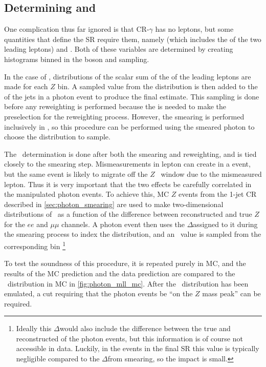 \subsection{Determining \HT and \mll}
\label{sec:photon_mll}

One complication thus far ignored is that CR-$\gamma$ has no leptons, but some quantities that define the \ac{SR} require them, namely \HT (which includes the \pt of the two leading leptons) and \mll. Both of these variables are determined by creating histograms binned in the boson \pt and sampling. 

In the case of \HT, distributions of the scalar sum of the \pt of the leading leptons are made for each $Z$ \pt bin. A sampled value from the distribution is then added to the \HT of the jets in a photon event to produce the final estimate. This sampling is done before any reweighting is performed because the \HT is needed to make the preselection for the reweighting process. However, the smearing is performed inclusively in \HT, so this procedure can be performed using the smeared photon \pt to choose the distribution to sample. 

The \mll~determination is done after both the smearing and reweighting, and is tied closely to the smearing step. Mismeasurements in lepton \pt can create \met in a \dyjets event, but the same event is likely to migrate off the $Z$ \mll~window due to the mismeasured lepton. Thus it is very important that the two effects be carefully correlated in the manipulated photon events. To achieve this, \ac{MC} $Z$ events from the 1-jet \ac{CR} described in \autoref{sec:photon_smearing} are used to make two-dimensional distributions of \mll~as a function of the difference between reconstructed and true $Z$ \pt for the $ee$ and $\mu\mu$ channels. A photon event then uses the $\Delta$\pt assigned to it during the smearing process to index the distribution, and an \mll~value is sampled from the corresponding bin \footnote{Ideally this $\Delta$\pt would also include the difference between the true and reconstructed \pt of the photon events, but this information is of course not accessible in data. Luckily, in the events in the final \ac{SR} this value is typically negligible compared to the $\Delta$\pt from smearing, so the impact is small.} 

To test the soundness of this procedure, it is repeated purely in \ac{MC}, and the results of the \ac{MC} prediction and the data prediction are compared to the \mll~distribution in \dyjets \ac{MC} in \autoref{fig:photon_mll_mc}. After the \mll~distribution has been emulated, a cut requiring that the photon events be ``on the $Z$ mass peak'' can be required.

